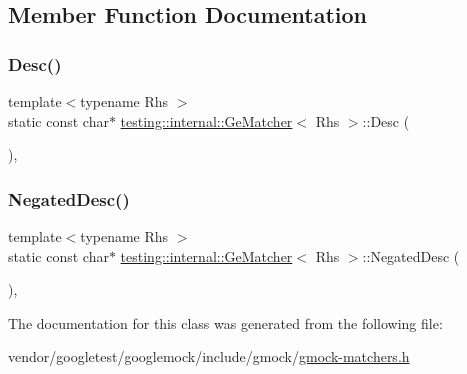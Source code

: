 \subsection{Member Function Documentation}
\mbox{\label{classtesting_1_1internal_1_1_ge_matcher_a5676836bfa354f4398dd083621a05877}} 
\subsubsection{\texorpdfstring{Desc()}{Desc()}}
{\footnotesize\ttfamily template$<$typename Rhs $>$ \\
static const char$\ast$ \hyperlink{classtesting_1_1internal_1_1_ge_matcher}{testing\+::internal\+::\+Ge\+Matcher}$<$ Rhs $>$\+::Desc (\begin{DoxyParamCaption}{ }\end{DoxyParamCaption})\hspace{0.3cm}{\ttfamily [inline]}, {\ttfamily [static]}}

\mbox{\label{classtesting_1_1internal_1_1_ge_matcher_a028847a76dbf02b8da3d56ce448ef053}} 
\subsubsection{\texorpdfstring{Negated\+Desc()}{NegatedDesc()}}
{\footnotesize\ttfamily template$<$typename Rhs $>$ \\
static const char$\ast$ \hyperlink{classtesting_1_1internal_1_1_ge_matcher}{testing\+::internal\+::\+Ge\+Matcher}$<$ Rhs $>$\+::Negated\+Desc (\begin{DoxyParamCaption}{ }\end{DoxyParamCaption})\hspace{0.3cm}{\ttfamily [inline]}, {\ttfamily [static]}}



The documentation for this class was generated from the following file\+:\begin{DoxyCompactItemize}
\item 
vendor/googletest/googlemock/include/gmock/\hyperlink{gmock-matchers_8h}{gmock-\/matchers.\+h}\end{DoxyCompactItemize}
